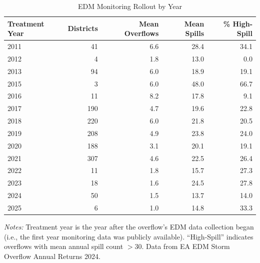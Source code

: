 \begin{table}[htbp]
\centering
\caption{EDM Monitoring Rollout by Year}
\label{tab:rollout}
\begin{tabular}{lrrrr}
\toprule
Treatment Year & Districts & Mean Overflows & Mean Spills & \% High-Spill \\
\midrule
2011 & 41 & 6.6 & 28.4 & 34.1 \\
2012 & 4 & 1.8 & 13.0 & 0.0 \\
2013 & 94 & 6.0 & 18.9 & 19.1 \\
2015 & 3 & 6.0 & 48.0 & 66.7 \\
2016 & 11 & 8.2 & 17.8 & 9.1 \\
2017 & 190 & 4.7 & 19.6 & 22.8 \\
2018 & 220 & 6.0 & 21.8 & 20.5 \\
2019 & 208 & 4.9 & 23.8 & 24.0 \\
2020 & 188 & 3.1 & 20.1 & 19.1 \\
2021 & 307 & 4.6 & 22.5 & 26.4 \\
2022 & 11 & 1.8 & 15.7 & 27.3 \\
2023 & 18 & 1.6 & 24.5 & 27.8 \\
2024 & 50 & 1.5 & 13.7 & 14.0 \\
2025 & 6 & 1.0 & 14.8 & 33.3 \\
\bottomrule
\end{tabular}
\begin{tablenotes}[flushleft]\small
\item \textit{Notes:} Treatment year is the year after the overflow's EDM data collection began (i.e., the first year monitoring data was publicly available). ``High-Spill'' indicates overflows with mean annual spill count $>30$. Data from EA EDM Storm Overflow Annual Returns 2024.
\end{tablenotes}
\end{table}

